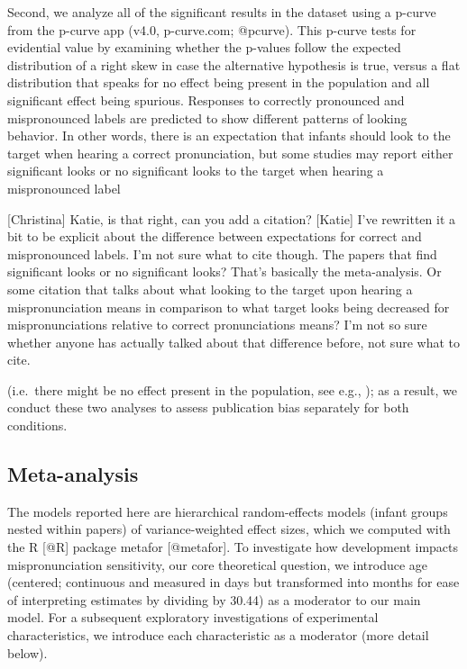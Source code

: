 \documentclass[man]{apa6}
\theoremstyle{definition}
\theoremstyle{definition}
\theoremstyle{definition}
\theoremstyle{remark}
\begin{document}
Second, we analyze all of the significant results in the dataset using a
p-curve from the p-curve app (v4.0, p-curve.com; @pcurve). This p-curve
tests for evidential value by examining whether the p-values follow the
expected distribution of a right skew in case the alternative hypothesis
is true, versus a flat distribution that speaks for no effect being
present in the population and all significant effect being spurious.
Responses to correctly pronounced and mispronounced labels are predicted
to show different patterns of looking behavior. In other words, there is
an expectation that infants should look to the target when hearing a
correct pronunciation, but some studies may report either significant
looks or no significant looks to the target when hearing a mispronounced
label

{[}Christina{]} Katie, is that right, can you add a citation?
{[}Katie{]} I've rewritten it a bit to be explicit about the difference
between expectations for correct and mispronounced labels. I'm not sure
what to cite though. The papers that find significant looks or no
significant looks? That's basically the meta-analysis. Or some citation
that talks about what looking to the target upon hearing a
mispronunciation means in comparison to what target looks being
decreased for mispronunciations relative to correct pronunciations
means? I'm not so sure whether anyone has actually talked about that
difference before, not sure what to cite.

(i.e.~there might be no effect present in the population, see e.g., );
as a result, we conduct these two analyses to assess publication bias
separately for both conditions.

\subsection{Meta-analysis}\label{meta-analysis}

The models reported here are hierarchical random-effects models (infant
groups nested within papers) of variance-weighted effect sizes, which we
computed with the R {[}@R{]} package metafor {[}@metafor{]}. To
investigate how development impacts mispronunciation sensitivity, our
core theoretical question, we introduce age (centered; continuous and
measured in days but transformed into months for ease of interpreting
estimates by dividing by 30.44) as a moderator to our main model. For a
subsequent exploratory investigations of experimental characteristics,
we introduce each characteristic as a moderator (more detail below).
\end{document}
